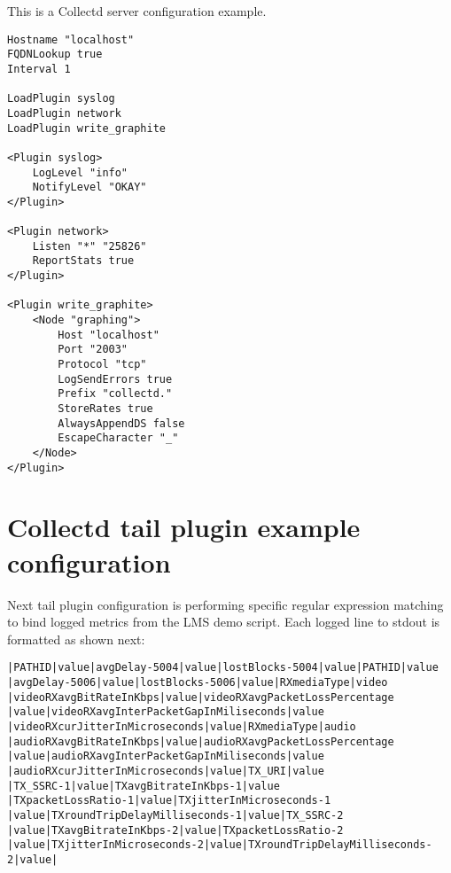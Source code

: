 This is a Collectd server configuration example.

\begin{verbatim}
Hostname "localhost"
FQDNLookup true
Interval 1

LoadPlugin syslog
LoadPlugin network
LoadPlugin write_graphite

<Plugin syslog>
	LogLevel "info"
	NotifyLevel "OKAY"
</Plugin>

<Plugin network>
	Listen "*" "25826"
	ReportStats true
</Plugin>

<Plugin write_graphite>
	<Node "graphing">
		Host "localhost"
		Port "2003"
		Protocol "tcp"
		LogSendErrors true
		Prefix "collectd."
		StoreRates true
		AlwaysAppendDS false
		EscapeCharacter "_"
	</Node>
</Plugin>
\end{verbatim}

\section{Collectd tail plugin example configuration}\label{ANX:collectdTailFiles2}

Next tail plugin configuration is performing specific regular expression matching to bind logged metrics from the LMS demo script. Each logged line to stdout is formatted as shown next:

\begin{verbatim}
|PATHID|value|avgDelay-5004|value|lostBlocks-5004|value|PATHID|value
|avgDelay-5006|value|lostBlocks-5006|value|RXmediaType|video
|videoRXavgBitRateInKbps|value|videoRXavgPacketLossPercentage
|value|videoRXavgInterPacketGapInMiliseconds|value
|videoRXcurJitterInMicroseconds|value|RXmediaType|audio
|audioRXavgBitRateInKbps|value|audioRXavgPacketLossPercentage
|value|audioRXavgInterPacketGapInMiliseconds|value
|audioRXcurJitterInMicroseconds|value|TX_URI|value
|TX_SSRC-1|value|TXavgBitrateInKbps-1|value
|TXpacketLossRatio-1|value|TXjitterInMicroseconds-1
|value|TXroundTripDelayMilliseconds-1|value|TX_SSRC-2
|value|TXavgBitrateInKbps-2|value|TXpacketLossRatio-2
|value|TXjitterInMicroseconds-2|value|TXroundTripDelayMilliseconds-2|value|
\end{verbatim}

